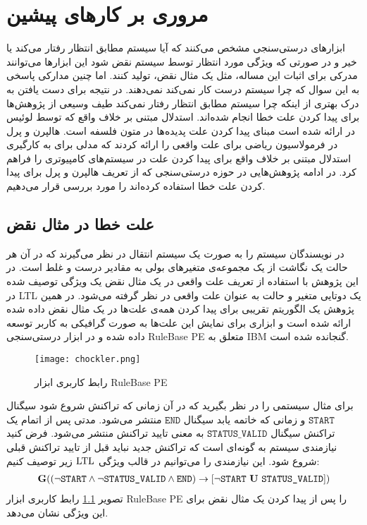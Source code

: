 \chapter{مروری بر کار‌های پیشین}
ابزار‌های درستی‌سنجی مشخص می‌کنند که آیا سیستم مطابق انتظار رفتار می‌کند یا خیر و در صورتی که ویژگی مورد انتظار توسط سیستم نقض شود این ابزارها می‌توانند مدرکی برای اثبات این مساله، مثل یک مثال نقض، تولید کنند.
اما چنین مدارکی پاسخی به این سوال که چرا سیستم درست کار نمی‌کند نمی‌دهند. 
در نتیجه برای دست یافتن به درک بهتری از اینکه چرا سیستم مطابق انتظار رفتار نمی‌کند طیف وسیعی از پژوهش‌ها برای  پیدا کردن علت خطا انجام شده‌اند.
استدلال مبتنی بر خلاف واقع که توسط لوئیس در 
\cite{lewis1973counterfactuals}
ارائه شده است مبنای پیدا کردن علت پدیده‌ها در متون فلسفه است.
هالپرن و پرل در 
\cite{hp}
فرمولاسیون ریاضی برای علت واقعی را ارائه کردند که مدلی برای به کارگیری استدلال مبتنی بر خلاف واقع برای پیدا کردن علت در سیستم‌های کامپیوتری را فراهم کرد.
در ادامه پژوهش‌هایی در حوزه درستی‌سنجی که از تعریف هالپرن و پرل برای پیدا کردن علت خطا استفاده کرده‌اند را مورد بررسی قرار می‌دهیم.


\section{علت خطا در مثال نقض}
در
\cite{chockler}
نویسندگان سیستم را به صورت یک سیستم انتقال%
در نظر می‌گیرند که در آن هر حالت یک نگاشت از یک مجموعه‌ی متغیر‌های بولی به مقادیر درست و غلط است.
در این پژوهش با استفاده از تعریف علت واقعی در یک مثال نقض یک ویژگی توصیف شده در
LTL%
یک دوتایی‌ متغیر و حالت به عنوان علت واقعی در نظر گرفته می‌شود.
در همین پژوهش یک الگوریتم تقریبی برای پیدا کردن همه‌ی علت‌ها در یک مثال نقض داده شده ارائه شده است و ابزاری برای نمایش این علت‌ها به صورت گرافیکی به کاربر توسعه داده شده و در ابزار درستی‌سنجی
RuleBase PE
متعلق به
IBM
گنجانده شده است.
\begin{figure}
    \centering
    \texttt{[image: chockler.png]}
    \caption{رابط کاربری ابزار
        RuleBase PE
    }
    \label{fig:rulebase}
\end{figure}
برای مثال
سیستمی را در نظر بگیرید که در آن زمانی که تراکنش شروع شود سیگنال 
$\texttt{START}$
و زمانی که خاتمه یابد سیگنال 
$\texttt{END}$
منتشر می‌شود.
مدتی پس از اتمام یک تراکنش سیگنال 
$\texttt{STATUS\_VALID}$
به معنی تایید تراکنش منتشر می‌شود.
فرض کنید نیازمندی سیستم به گونه‌ای است که تراکنش جدید نباید قبل از تایید تراکنش قبلی شروع شود. 
این نیازمندی را می‌توانیم در قالب ویژگی 
$\mathrm{LTL}$
زیر توصیف کنیم:
\begin{align*}
    \boldsymbol{\mr{G}}((\neg \texttt{START} \wedge \neg \texttt{STATUS\_VALID} \wedge \texttt{END}) 
    \ra [\neg \texttt{START}\ \boldsymbol{\mr{U}}\ \texttt{STATUS\_VALID}])
\end{align*}
تصویر
\ref{fig:rulebase}
رابط کاربری ابزار 
RuleBase PE
را پس از پیدا کردن یک مثال نقض برای این ویژگی نشان می‌دهد.

